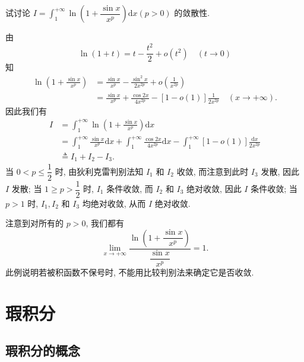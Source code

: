 \begin{example}\label{example:ma-8-2-6}
试讨论 $I=\int_1^{+\infty}\ln\left(1+\dfrac{\sin x}{x^p}\right)\mathrm dx(p>0)$ 的敛散性.
\end{example}


\begin{solve}
由
\[
  \ln(1+t)=t-\frac{t^2}{2}+o(t^2)\quad(t\to0)
\]
知
\[
\begin{aligned}
  \ln\left(1+\frac{\sin x}{x^p}\right)
  &=
  \frac{\sin x}{x^p}
  -
  \frac{\sin^2x}{2x^{2p}}
  +
  o\left(\frac1{x^{2p}}\right)\\
  &=
  \frac{\sin x}{x^p}
  +
  \frac{\cos2x}{4x^{2p}}
  -
  [1-o(1)]\frac1{2x^{2p}}
  \quad(x\to+\infty).
\end{aligned}
\]
因此我们有
\[
\begin{aligned}
  I
  &=
  \int_1^{+\infty}\ln\left(1+\frac{\sin x}{x^p}\right)\mathrm dx\\
  &=
  \int_1^{+\infty}\frac{\sin x}{x^p}\mathrm dx
  +
  \int_1^{+\infty}\frac{\cos2x}{4x^{2p}}\mathrm dx
  -
  \int_1^{+\infty}[1-o(1)]\frac{\mathrm dx}{2x^{2p}}\\
  &\triangleq I_1+I_2-I_3.
\end{aligned}
\]
当 $0<p\leq\dfrac12$ 时, 由狄利克雷判别法知 $I_1$ 和 $I_2$ 收敛, 而注意到此时 $I_3$ 发散, 因此 $I$ 发散; 当 $1\geq p>\dfrac12$ 时, $I_1$ 条件收敛, 而 $I_2$ 和 $I_3$ 绝对收敛, 因此 $I$ 条件收敛; 当 $p>1$ 时, $I_1,I_2$ 和 $I_3$ 均绝对收敛, 从而 $I$ 绝对收敛.
\end{solve}


\begin{remark}\label{remark:ma-8-source-42}
注意到对所有的 $p>0$, 我们都有
\[
  \lim_{x\to+\infty}
  \frac{\ln\left(1+\dfrac{\sin x}{x^p}\right)}{\dfrac{\sin x}{x^p}}
  =
  1.
\]
此例说明若被积函数不保号时, 不能用比较判别法来确定它是否收敛.
\end{remark}


\section{瑕积分}
\label{sec:ma-8-3}

\subsection{瑕积分的概念}
\label{subsec:ma-8-3-1}

